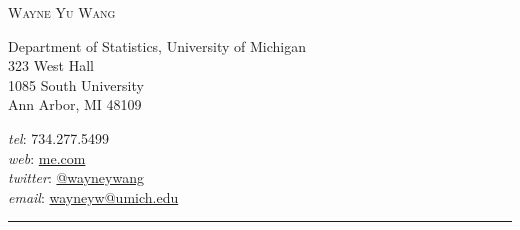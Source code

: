\documentclass[11pt]{article}
\makeatletter
\newcommand{\myname}{Wayne Yu Wang}     %
\newcommand{\websiteurl}{{https://ywa136.github.io}} %
\newcommand{\websitename}{me.com}       %
\newcommand{\phone}{734.277.5499}       %
\newcommand{\email}{wayneyw@umich.edu}  %
\newcommand{\twitterurl}{{https://twitter.com/wayneywang}}  %
\newcommand{\twitterhandle}{@wayneywang}      %
\newcommand{\address}{                  %
  Department of Statistics, University of Michigan \\
  323 West Hall \\
  1085 South University \\    
  Ann Arbor, MI 48109                   
}
\makeatother
\begin{document}
\thispagestyle{first}


%

\hspace*{-\parindent}%
\begin{center}
  \vspace{-2em}
  {\LARGE\scshape \myname} \\
\end{center}
\begin{minipage}[t]{.6\linewidth}
\address
\end{minipage}
\hspace*{-\parindent}%
\begin{minipage}[t]{.43\linewidth}
\begin{flushright}
  \textit{tel}: \phone \\
  \textit{web}: \href{\websiteurl}{\websitename} \\
  \textit{twitter}: \href{\twitterurl}{\twitterhandle} \\
  \textit{email}: \href{mailto:\email}{\email}
\end{flushright}
\end{minipage}
\begin{center}
  \vspace{-.5em}
  \rule{\textwidth}{1pt}  
\end{center}



\end{document}
